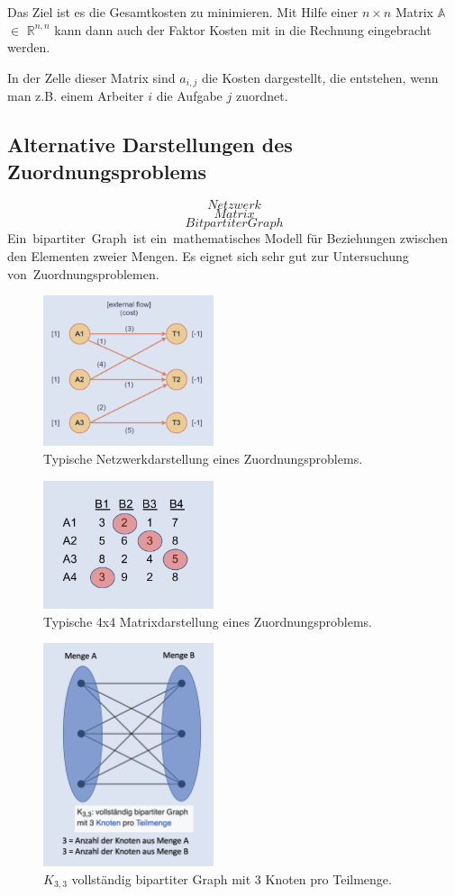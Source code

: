 Das Ziel ist es die Gesamtkosten zu minimieren. Mit Hilfe einer $n\times n$ Matrix $\mathbb{A}$ $\mathbb{\in}$ $\mathbb{R}^{n,n}$ kann dann auch der Faktor Kosten mit in die Rechnung eingebracht werden. 

In der Zelle dieser Matrix sind $a_{i,j}$ die Kosten dargestellt, die entstehen, wenn man z.B. einem Arbeiter $i$ die Aufgabe $j$ zuordnet.

\subsection{Alternative Darstellungen des Zuordnungsproblems
\label{munkres:subsection:bonorum}}
\begin{equation}
Netzwerk
\end{equation}
\begin{equation}
Matrix
\end{equation}
\begin{equation}
Bitpartiter Graph
\end{equation}
Ein bipartiter Graph ist ein mathematisches Modell für Beziehungen
zwischen den Elementen zweier Mengen.
Es eignet sich sehr gut zur Untersuchung von Zuordnungsproblemen. 
\begin{figure}
\centering
\includegraphics[width=5cm]{papers/munkres/figures/Netzwerkdarstellung}
\caption{Typische Netzwerkdarstellung eines Zuordnungsproblems.}
\label{munkres:Vr2}
\end{figure}

\begin{figure}
\centering
\includegraphics[width=5cm]{papers/munkres/figures/Matrixdarstellung}
\caption{Typische 4x4 Matrixdarstellung eines Zuordnungsproblems.}
\label{munkres:Vr2}
\end{figure}

\begin{figure}
\centering
\includegraphics[width=5cm]{papers/munkres/figures/bipartiter_graph}
\caption{$K_{3,3}$ vollständig bipartiter Graph mit 3 Knoten pro Teilmenge.}
\label{munkres:Vr2}
\end{figure}
